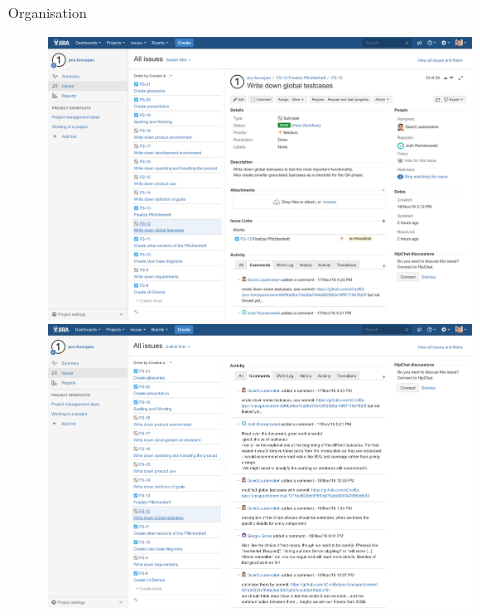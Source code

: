 \documentclass[19pt]{beamer}
\begin{document}
\begin{frame}[allowframebreaks]{Organisation}
	\begin{figure}
		\begin{center}
			\includegraphics[scale=0.18]{logos/JIRA01} 
		\end{center}
		\framebreak
		\begin{center}
			\includegraphics[scale=0.18]{logos/JIRA02} 
		\end{center}
		\framebreak
		\begin{center}

\end{center}
\end{figure}
\end{frame}
\end{document}
